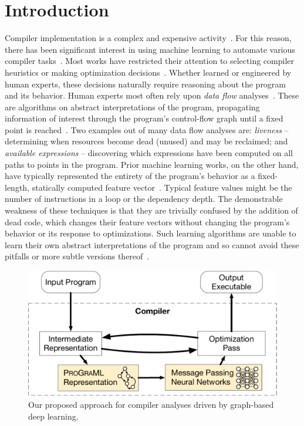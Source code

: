 \section{Introduction}

Compiler implementation is a complex and expensive activity~\citep{Cooper2012}.
For this reason, there has been significant interest in using machine learning
to automate various compiler tasks~\citep{Allamanis2017a}. Most works have
restricted their attention to selecting compiler heuristics or making
optimization decisions~\citep{leather2020mlinc}. Whether learned or engineered
by human experts, these decisions naturally require reasoning about the program
and its behavior. Human experts most often rely upon \textit{data flow}
analyses~\citep{Kildall1973,Kam1976}. These are algorithms on abstract
interpretations of the program, propagating information of interest through the
program's control-flow graph until a fixed point is reached~\citep{Kam1977}. Two
examples out of many data flow analyses are: \emph{liveness} -- determining when
resources become dead (unused) and may be reclaimed; and \emph{available
expressions} -- discovering which expressions have been computed on all paths to
points in the program. Prior machine learning works, on the other hand, have
typically represented the entirety of the program's behavior as a fixed-length,
statically computed feature vector~\citep{Ashouri2018}. Typical feature values
might be the number of instructions in a loop or the dependency depth. The
demonstrable weakness of these techniques is that they are trivially confused by
the addition of dead code, which changes their feature vectors without changing
the program's behavior or its response to optimizations. Such learning
algorithms are unable to learn their own abstract interpretations of the program
and so cannot avoid these pitfalls or more subtle versions
thereof~\citep{Barchi2019a}.

\begin{figure}[t]
 \centering %
 \includegraphics[width=.85\linewidth]{images/overview}
 \caption{%
    Our proposed approach for compiler analyses driven by graph-based deep
    learning.%
 }%
 \label{figure:overview}%
\end{figure}

